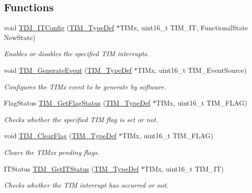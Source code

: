 \subsection*{Functions}
\begin{DoxyCompactItemize}
\item 
void \hyperlink{group___t_i_m___group5_ga70e3d6c09d55ee69002e154c85cd40e4}{T\+I\+M\+\_\+\+I\+T\+Config} (\hyperlink{struct_t_i_m___type_def}{T\+I\+M\+\_\+\+Type\+Def} $\ast$T\+I\+Mx, uint16\+\_\+t T\+I\+M\+\_\+\+IT, Functional\+State New\+State)
\begin{DoxyCompactList}\small\item\em Enables or disables the specified T\+IM interrupts. \end{DoxyCompactList}\item 
void \hyperlink{group___t_i_m___group5_ga38bd4ffda920dd4f7655a0a2c6100a6e}{T\+I\+M\+\_\+\+Generate\+Event} (\hyperlink{struct_t_i_m___type_def}{T\+I\+M\+\_\+\+Type\+Def} $\ast$T\+I\+Mx, uint16\+\_\+t T\+I\+M\+\_\+\+Event\+Source)
\begin{DoxyCompactList}\small\item\em Configures the T\+I\+Mx event to be generate by software. \end{DoxyCompactList}\item 
Flag\+Status \hyperlink{group___t_i_m___group5_ga0adcbbd5e838ec8642e7a9b80075f41f}{T\+I\+M\+\_\+\+Get\+Flag\+Status} (\hyperlink{struct_t_i_m___type_def}{T\+I\+M\+\_\+\+Type\+Def} $\ast$T\+I\+Mx, uint16\+\_\+t T\+I\+M\+\_\+\+F\+L\+AG)
\begin{DoxyCompactList}\small\item\em Checks whether the specified T\+IM flag is set or not. \end{DoxyCompactList}\item 
void \hyperlink{group___t_i_m___group5_ga46568c7b254941dc53e785342d60baf3}{T\+I\+M\+\_\+\+Clear\+Flag} (\hyperlink{struct_t_i_m___type_def}{T\+I\+M\+\_\+\+Type\+Def} $\ast$T\+I\+Mx, uint16\+\_\+t T\+I\+M\+\_\+\+F\+L\+AG)
\begin{DoxyCompactList}\small\item\em Clears the T\+I\+Mx\textquotesingle{}s pending flags. \end{DoxyCompactList}\item 
I\+T\+Status \hyperlink{group___t_i_m___group5_ga0827a0b411707304f76d33050727c24d}{T\+I\+M\+\_\+\+Get\+I\+T\+Status} (\hyperlink{struct_t_i_m___type_def}{T\+I\+M\+\_\+\+Type\+Def} $\ast$T\+I\+Mx, uint16\+\_\+t T\+I\+M\+\_\+\+IT)
\begin{DoxyCompactList}\small\item\em Checks whether the T\+IM interrupt has occurred or not. \end{DoxyCompactList}\item 

\end{DoxyCompactItemize}
